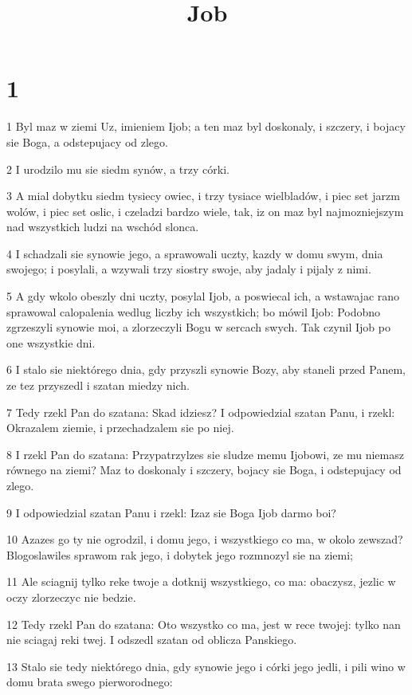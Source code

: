 

\title{Job}


\chapter{1}

\par 1 Byl maz w ziemi Uz, imieniem Ijob; a ten maz byl doskonaly, i szczery, i bojacy sie Boga, a odstepujacy od zlego.
\par 2 I urodzilo mu sie siedm synów, a trzy córki.
\par 3 A mial dobytku siedm tysiecy owiec, i trzy tysiace wielbladów, i piec set jarzm wolów, i piec set oslic, i czeladzi bardzo wiele, tak, iz on maz byl najmozniejszym nad wszystkich ludzi na wschód slonca.
\par 4 I schadzali sie synowie jego, a sprawowali uczty, kazdy w domu swym, dnia swojego; i posylali, a wzywali trzy siostry swoje, aby jadaly i pijaly z nimi.
\par 5 A gdy wkolo obeszly dni uczty, posylal Ijob, a poswiecal ich, a wstawajac rano sprawowal calopalenia wedlug liczby ich wszystkich; bo mówil Ijob: Podobno zgrzeszyli synowie moi, a zlorzeczyli Bogu w sercach swych. Tak czynil Ijob po one wszystkie dni.
\par 6 I stalo sie niektórego dnia, gdy przyszli synowie Bozy, aby staneli przed Panem, ze tez przyszedl i szatan miedzy nich.
\par 7 Tedy rzekl Pan do szatana: Skad idziesz? I odpowiedzial szatan Panu, i rzekl: Okrazalem ziemie, i przechadzalem sie po niej.
\par 8 I rzekl Pan do szatana: Przypatrzylzes sie sludze memu Ijobowi, ze mu niemasz równego na ziemi? Maz to doskonaly i szczery, bojacy sie Boga, i odstepujacy od zlego.
\par 9 I odpowiedzial szatan Panu i rzekl: Izaz sie Boga Ijob darmo boi?
\par 10 Azazes go ty nie ogrodzil, i domu jego, i wszystkiego co ma, w okolo zewszad? Blogoslawiles sprawom rak jego, i dobytek jego rozmnozyl sie na ziemi;
\par 11 Ale sciagnij tylko reke twoje a dotknij wszystkiego, co ma: obaczysz, jezlic w oczy zlorzeczyc nie bedzie.
\par 12 Tedy rzekl Pan do szatana: Oto wszystko co ma, jest w rece twojej: tylko nan nie sciagaj reki twej. I odszedl szatan od oblicza Panskiego.
\par 13 Stalo sie tedy niektórego dnia, gdy synowie jego i córki jego jedli, i pili wino w domu brata swego pierworodnego:
